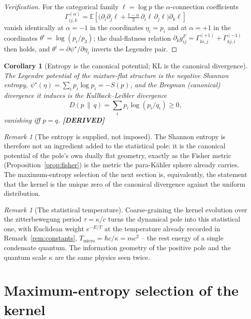 \documentclass[11pt,oneside]{book}
\newcommand{\status}[1]{{\sffamily\bfseries\color{statuscol}[#1]}}
\theoremstyle{plain}
\newtheorem{corollary}[theorem]{Corollary}
\theoremstyle{definition}
\theoremstyle{remark}
\newtheorem{remark}[theorem]{Remark}
\begin{document}
\begin{proof}[Verification]
For the categorical family $\ell=\log p$ the $\alpha$-connection coefficients
\[
  \Gamma^{(\alpha)}_{ij,k}=\mathbb E\!\left[\bigl(\partial_i\partial_j\ell
  +\tfrac{1-\alpha}{2}\,\partial_i\ell\,\partial_j\ell\bigr)\partial_k\ell\right]
\]
vanish identically at $\alpha=-1$ in the coordinates $\eta_i=p_i$ and at $\alpha=+1$
in the coordinates $\theta^i=\log(p_i/p_3)$; the dual-flatness relation
$\partial_k g^F_{ij}=\Gamma^{(+1)}_{ki,j}+\Gamma^{(-1)}_{kj,i}$ then holds, and
$\theta^i=\partial\psi^\star/\partial\eta_i$ inverts the Legendre pair.
\end{proof}

\begin{corollary}[Entropy is the canonical potential; KL is the canonical divergence]
\label{cor:entropy-potential}
The Legendre potential of the mixture-flat structure is the negative Shannon entropy,
$\psi^\star(\eta)=\sum_i p_i\log p_i=-S(p)$, and the Bregman (canonical) divergence it
induces is the Kullback--Leibler divergence
\[
  D(p\,\|\,q)=\sum_i p_i\log(p_i/q_i)\ge0,
\]
vanishing iff $p=q$. \status{DERIVED}
\end{corollary}

\begin{remark}[The entropy is supplied, not imposed]
The Shannon entropy is therefore not an ingredient added to the statistical pole: it
is the canonical potential of the pole's own dually flat geometry, exactly as the
Fisher metric (Proposition~\ref{prop:fisher}) is the metric the para-K\"ahler sphere
already carries. The maximum-entropy selection of the next section is, equivalently,
the statement that the kernel is the unique zero of the canonical divergence against
the uniform distribution.
\end{remark}

\begin{remark}[The statistical temperature]
Coarse-graining the kernel evolution over the zitterbewegung period $\tau=\kappa/c$
turns the dynamical pole into this statistical one, with Euclidean weight $e^{-E/T}$
at the temperature already recorded in Remark~\ref{rem:constants},
$T_{\mathrm{micro}}=\hbar c/\kappa=mc^2$ -- the rest energy of a single condensate
quantum. The information geometry of the positive pole and the quantum scale $\kappa$
are the same physics seen twice.
\end{remark}

\section{Maximum-entropy selection of the kernel}
\label{sec:maxent}
\end{document}
